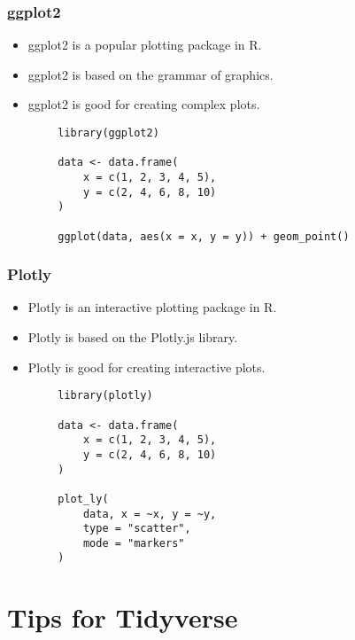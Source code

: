 \documentclass[serif, 9pt, aspectratio=32]{beamer}
\begin{document}
\begin{frame}
    \centering
    \frametitle{ggplot2}
    \begin{itemize}
        \setlength{\itemsep}{2em}
        \item ggplot2 is a popular plotting package in R.
        \item ggplot2 is based on the grammar of graphics.
        \item ggplot2 is good for creating complex plots.
    \end{itemize}
\end{frame}

\begin{frame}[fragile]
    \begin{lstlisting}
        library(ggplot2)

        data <- data.frame(
            x = c(1, 2, 3, 4, 5),
            y = c(2, 4, 6, 8, 10)
        )

        ggplot(data, aes(x = x, y = y)) + geom_point()
    \end{lstlisting}
\end{frame}

\begin{frame}
    \centering
    \frametitle{Plotly}
    \begin{itemize}
        \setlength{\itemsep}{2em}
        \item Plotly is an interactive plotting package in R.
        \item Plotly is based on the Plotly.js library.
        \item Plotly is good for creating interactive plots.
    \end{itemize}
\end{frame}

\begin{frame}[fragile]
    \begin{lstlisting}
        library(plotly)

        data <- data.frame(
            x = c(1, 2, 3, 4, 5),
            y = c(2, 4, 6, 8, 10)
        )

        plot_ly(
            data, x = ~x, y = ~y, 
            type = "scatter", 
            mode = "markers"
        )
    \end{lstlisting}
\end{frame}

\section{Tips for Tidyverse}
\end{document}
